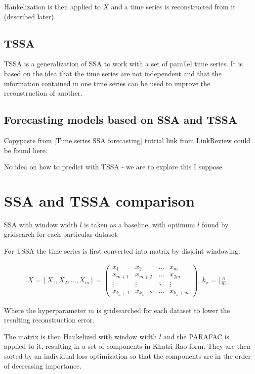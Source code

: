 \documentclass{article}
\begin{document}
Hankelization is then applied to \(X\) and a time series is reconstructed from it (described later).

\subsection{TSSA}

TSSA is a generalization of SSA to work with a set of parallel time series. It is based on the idea that the time series are not independent and that the information contained in one time series can be used to improve the reconstruction of another.

\subsection{Forecasting models based on SSA and TSSA}

Copypaste from [Time series SSA forecasting] tutrial link from LinkReview could be found here.

No idea on how to predict with TSSA - we are to explore this I suppose

\section{SSA and TSSA comparison}

SSA with window width \(l\) is taken as a baseline, with optimum \(l\) found by gridsearch for each particular dataset.

For TSSA the time series is first converted into matrix by disjoint windowing:

\begin{gather}
X = [X_1, X_2, ..., X_{m}] =
 \begin{pmatrix}
	x_{1} & x_{2} & \dots & x_{m} \\
	x_{m+1} & x_{m+2} & \dots & x_{2m} \\
	\vdots & \vdots & \ddots & \vdots \\
	x_{k_{x}+1} & x_{k_x + 2} &  \dots & x_{k_x + m}
\end{pmatrix} \text{, }
k_x = \lfloor \frac{n}{m} \rfloor
\end{gather}

Where the hyperparameter \(m\) is gridsearched for each dataset to lower the resulting reconstruction error.

The matrix is then Hankelized with window width \(l\) and the PARAFAC is applied to it, resulting in a set of components in Khatri-Rao form. They are then sorted by an individual loss optimization so that the components are in the order of decreasing importance.
\end{document}
